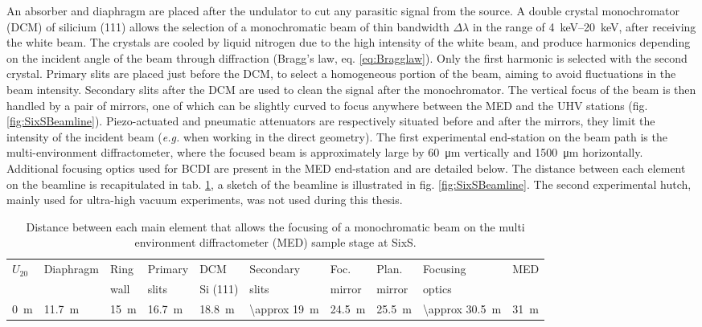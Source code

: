 An absorber and diaphragm are placed after the undulator to cut any parasitic signal from the source.
A double crystal monochromator (DCM) of silicium (111) allows the selection of a monochromatic beam of thin bandwidth $\Delta \lambda$ in the range of \qtyrange{4}{20}{\keV}, after receiving the white beam.
The crystals are cooled by liquid nitrogen due to the high intensity of the white beam, and produce harmonics depending on the incident angle of the beam through diffraction (Bragg's law, eq. \ref{eq:Bragglaw}).
Only the first harmonic is selected with the second crystal.
Primary slits are placed just before the DCM, to select a homogeneous portion of the beam, aiming to avoid fluctuations in the beam intensity.
Secondary slits after the DCM are used to clean the signal after the monochromator.
The vertical focus of the beam is then handled by a pair of mirrors, one of which can be slightly curved to focus anywhere between the MED and the UHV stations (fig. \ref{fig:SixSBeamline}).
Piezo-actuated and pneumatic attenuators are respectively situated before and after the mirrors, they limit the intensity of the incident beam (\textit{e.g.} when working in the direct geometry).
The first experimental end-station on the beam path is the multi-environment diffractometer, where the focused beam is approximately large by \qty{60}{\um} vertically and \qty{1500}{\um} horizontally.
Additional focusing optics used for BCDI are present in the MED end-station and are detailed below.
The distance between each element on the beamline is recapitulated in tab. \ref{tab:DistanceSixS}, a sketch of the beamline is illustrated in fig. \ref{fig:SixSBeamline}.
The second experimental hutch, mainly used for ultra-high vacuum experiments, was not used during this thesis.

\begin{table}[!htb]
	\centering
    \small{
	\begin{tabular}{@{}llllllllll@{}}
	\toprule
	$U_{20}$ & Diaphragm & Ring    & Primary     & DCM         & Secondary       & Foc.      & Plan.     & Focusing &  MED \\
	         &           & wall    & slits       & Si (111)    & slits           & mirror    & mirror    & optics        &  \\
 	\midrule
 	\qty{0}{\m}&\qty{11.7}{\m}&\qty{15}{\m}&\qty{16.7}{\m}&\qty{18.8}{\m}&\qty{\approx 19}{\m}&\qty{24.5}{\m}&\qty{25.5}{\m}&\qty{\approx 30.5}{\m}&\qty{31}{\m}
	\end{tabular}
    }
	\caption{
		Distance between each main element that allows the focusing of a monochromatic beam on the multi environment diffractometer (MED) sample stage at SixS.
	}
    \label{tab:DistanceSixS}
\end{table}

